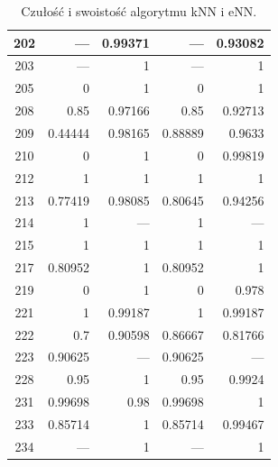 \begin{table}[H]
\begin{tabular}{|c|r|r|r|r|}
\hline                                   
202 &--- &0.99371 &--- &0.93082\\        
\hline                                   
203 &--- &1 &--- &1\\                    
\hline                                   
205 &0 &1 &0 &1\\                        
\hline                                   
208 &0.85 &0.97166 &0.85 &0.92713\\      
\hline                                   
209 &0.44444 &0.98165 &0.88889 &0.9633\\ 
\hline                                   
210 &0 &1 &0 &0.99819\\                  
\hline                                   
212 &1 &1 &1 &1\\                        
\hline                                   
213 &0.77419 &0.98085 &0.80645 &0.94256\\
\hline                                   
214 &1 &--- &1 &---\\                    
\hline                                   
215 &1 &1 &1 &1\\                        
\hline                                   
217 &0.80952 &1 &0.80952 &1\\            
\hline                                   
219 &0 &1 &0 &0.978\\                    
\hline                                   
221 &1 &0.99187 &1 &0.99187\\            
\hline                                   
222 &0.7 &0.90598 &0.86667 &0.81766\\    
\hline                                   
223 &0.90625 &--- &0.90625 &---\\        
\hline                                   
228 &0.95 &1 &0.95 &0.9924\\             
\hline                                   
231 &0.99698 &0.98 &0.99698 &1\\         
\hline                                   
233 &0.85714 &1 &0.85714 &0.99467\\      
\hline                                   
234 &--- &1 &--- &1\\                    
\hline                                   
	\end{tabular}
	\caption{Czułość i swoistość algorytmu kNN i eNN.}
	\label{tab:matlab-wskazniki}
\end{table}

